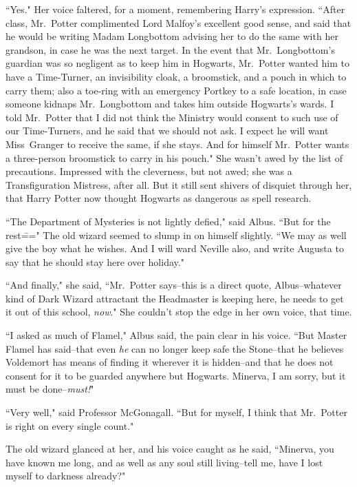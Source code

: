 ``Yes." Her voice faltered, for a moment, remembering Harry's expression. ``After class, Mr.~Potter complimented Lord Malfoy's excellent good sense, and said that he would be writing Madam Longbottom advising her to do the same with her grandson, in case he was the next target. In the event that Mr.~Longbottom's guardian was so negligent as to keep him in Hogwarts, Mr.~Potter wanted him to have a Time-Turner, an invisibility cloak, a broomstick, and a pouch in which to carry them; also a toe-ring with an emergency Portkey to a safe location, in case someone kidnaps Mr.~Longbottom and takes him outside Hogwarts's wards. I told Mr.~Potter that I did not think the Ministry would consent to such use of our Time-Turners, and he said that we should not ask. I expect he will want Miss~Granger to receive the same, if she stays. And for himself Mr.~Potter wants a three-person broomstick to carry in his pouch." She wasn't awed by the list of precautions. Impressed with the cleverness, but not awed; she was a Transfiguration Mistress, after all. But it still sent shivers of disquiet through her, that Harry Potter now thought Hogwarts as dangerous as spell research.

``The Department of Mysteries is not lightly defied," said Albus. ``But for the rest\===" The old wizard seemed to slump in on himself slightly. ``We may as well give the boy what he wishes. And I will ward Neville also, and write Augusta to say that he should stay here over holiday."

``And finally," she said, ``Mr.~Potter says\---this is a direct quote, Albus\---whatever kind of Dark Wizard attractant the Headmaster is keeping here, he needs to get it out of this school, \emph{now}." She couldn't stop the edge in her own voice, that time.

``I asked as much of Flamel," Albus said, the pain clear in his voice. ``But Master Flamel has said\---that even \emph{he} can no longer keep safe the Stone\---that he believes Voldemort has means of finding it wherever it is hidden\---and that he does not consent for it to be guarded anywhere but Hogwarts. Minerva, I am sorry, but it must be done\---\emph{must!}"

``Very well," said Professor McGonagall. ``But for myself, I think that Mr.~Potter is right on every single count."

The old wizard glanced at her, and his voice caught as he said, ``Minerva, you have known me long, and as well as any soul still living\---tell me, have I lost myself to darkness already?"

